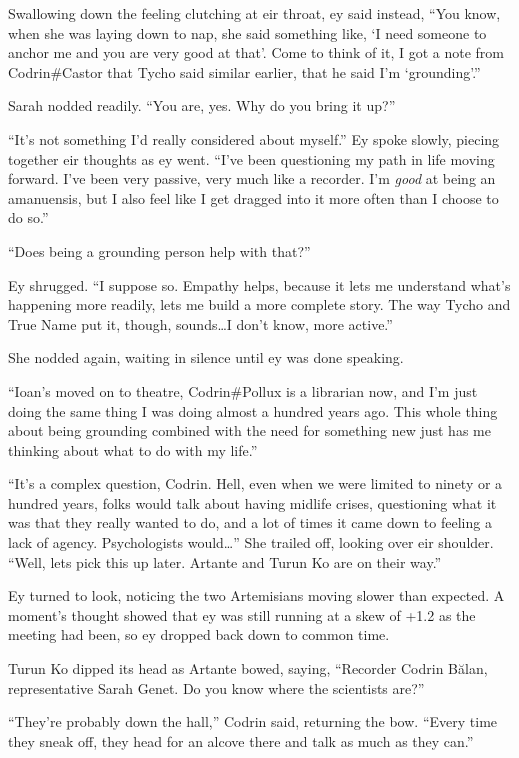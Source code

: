 Swallowing down the feeling clutching at eir throat, ey said instead, ``You know, when she was laying down to nap, she said something like, `I need someone to anchor me and you are very good at that'. Come to think of it, I got a note from Codrin\#Castor that Tycho said similar earlier, that he said I'm `grounding'.''

Sarah nodded readily. ``You are, yes. Why do you bring it up?''

``It's not something I'd really considered about myself.'' Ey spoke slowly, piecing together eir thoughts as ey went. ``I've been questioning my path in life moving forward. I've been very passive, very much like a recorder. I'm \emph{good} at being an amanuensis, but I also feel like I get dragged into it more often than I choose to do so.''

``Does being a grounding person help with that?''

Ey shrugged. ``I suppose so. Empathy helps, because it lets me understand what's happening more readily, lets me build a more complete story. The way Tycho and True Name put it, though, sounds\ldots I don't know, more active.''

She nodded again, waiting in silence until ey was done speaking.

``Ioan's moved on to theatre, Codrin\#Pollux is a librarian now, and I'm just doing the same thing I was doing almost a hundred years ago. This whole thing about being grounding combined with the need for something new just has me thinking about what to do with my life.''

``It's a complex question, Codrin. Hell, even when we were limited to ninety or a hundred years, folks would talk about having midlife crises, questioning what it was that they really wanted to do, and a lot of times it came down to feeling a lack of agency. Psychologists would\ldots{}'' She trailed off, looking over eir shoulder. ``Well, lets pick this up later. Artante and Turun Ko are on their way.''

Ey turned to look, noticing the two Artemisians moving slower than expected. A moment's thought showed that ey was still running at a skew of +1.2 as the meeting had been, so ey dropped back down to common time.

Turun Ko dipped its head as Artante bowed, saying, ``Recorder Codrin Bălan, representative Sarah Genet. Do you know where the scientists are?''

``They're probably down the hall,'' Codrin said, returning the bow. ``Every time they sneak off, they head for an alcove there and talk as much as they can.''

